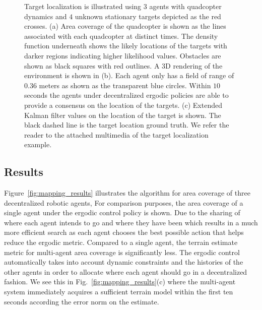 \documentclass[letterpaper, 10 pt, conference]{ieeeconf}  %
\begin{document}
\begin{figure}[thpb]
\centering
{}
\caption{
Target localization is illustrated using $3$ agents with quadcopter dynamics and $4$ unknown stationary targets depicted as the red crosses.
(a) Area coverage of the quadcopter is shown as the lines associated with each quadcopter  at distinct times.
The density function underneath shows the likely locations of the targets with darker regions indicating higher likelihood values.
Obstacles are shown as black squares with red outlines. A 3D rendering of the environment is shown in (b). 
Each agent only has a field of range of $0.36$ meters as shown as the transparent blue circles.
Within $10$ seconds the agents under decentralized ergodic policies are able to provide a consensus on the location of the targets. 
(c) Extended Kalman filter values on the location of the target is shown. The black dashed line is the target location ground truth. 
We refer the reader to the attached multimedia of the target localization example.
}
\label{fig:target_local}
\end{figure}

\subsection{Results}
Figure~\ref{fig:mapping_results} illustrates the algorithm for area coverage of three decentralized robotic agents,
For comparison purposes, the area coverage of a single agent under the ergodic control policy is shown.
Due to the sharing of where each agent intends to go and where they have been which results in a much more efficient search as each agent chooses the best possible action that helps reduce the ergodic metric. 
Compared to a single agent, the terrain estimate metric for multi-agent area coverage is significantly less.
The ergodic control automatically takes into account dynamic constraints and the histories of the other agents in order to allocate where each agent should go in a decentralized fashion.
We see this in Fig.~\ref{fig:mapping_results}(c) where the multi-agent system immediately acquires a sufficient terrain model within the first ten seconds according the error norm on the estimate.
\end{document}
